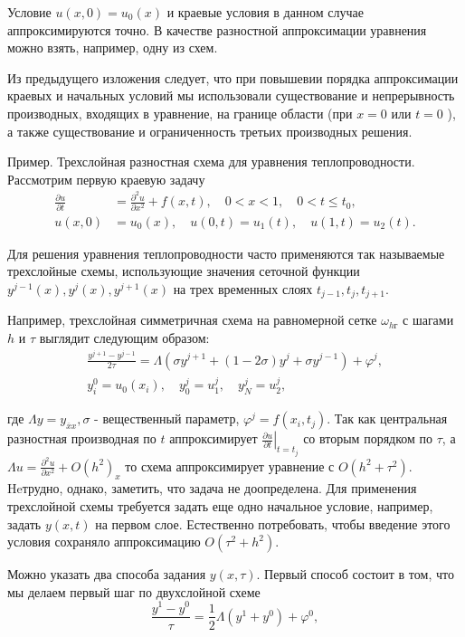 Условие $u(x, 0)=u_0(x)$ и краевые условия в данном случае аппроксимируются точно. В качестве разностной аппроксимации уравнения можно взять, например, одну из схем.

Из предыдущего изложения следует, что при повышевии порядка аппроксимации краевых и начальных условий мы использовали существование и непрерывность производных, входящих в уравнение, на границе области (при $x=0$ или $t=0$ ), а также существование и ограниченность третьих производных решения.

Пример. Трехслойная разностная схема для уравнения теплопроводности. Рассмотрим первую краевую задачу
$$
\begin{aligned}
	\frac{\partial u}{\partial t} & =\frac{\partial^2 u}{\partial x^2}+f(x, t), \quad 0<x<1, \quad 0<t \leqslant t_0, \\
	u(x, 0) & =u_0(x), \quad u(0, t)=u_1(t), \quad u(1, t)=u_2(t) .
\end{aligned}
$$

Для решения уравнения теплопроводности часто применяются так называемые трехслойные схемы, использующие значения сеточной функции $y^{j-1}(x), y^j(x), y^{j+1}(x)$ на трех временных слоях $t_{j-1}, t_j, t_{j+1}$.

Например, трехслойная симметричная схема на равномерной сетке $\omega_{h г}$ с шагами $h$ и $\tau$ выглядит следующим образом:
$$
\begin{gathered}
	\frac{y^{j+1}-y^{j-1}}{2 \tau}=\Lambda\left(\sigma y^{j+1}+(1-2 \sigma) y^j+\sigma y^{j-1}\right)+\varphi^j, \\
	y_i^0=u_0\left(x_i\right), \quad y_0^j=u_1^j, \quad y_N^j=u_2^j,
\end{gathered}
$$

где $\Lambda y=y_{\overline{x} x}, \sigma$ - вещественный параметр, $\varphi^j=f\left(x_i, t_j\right)$.
Так как центральная разностная производная по $t$ аппроксимирует $\left.\frac{\partial u}{\partial t}\right|_{t=t_j}$ со вторым порядком по $\tau$, а $\Lambda u=\frac{\partial^2 u}{\partial x^2}+O\left(h^2\right)_x$ то схема аппроксимирует уравнение с $O\left(h^2+\tau^2\right)$. Heтрудно, однако, заметить, что задача не доопределена. Для применения трехслойной схемы требуется задать еще одно начальное условие, например, задать $y(x, t)$ на первом слое. Естественно потребовать, чтобы введение этого условия сохраняло аппроксимацию $O\left(\tau^2+h^2\right)$.

Можно указать два способа задания $y(x, \tau)$. Первый способ состоит в том, что мы делаем первый шаг по двухслойной схеме
$$
\frac{y^1-y^0}{\tau}=\frac{1}{2} \Lambda\left(y^1+y^0\right)+\varphi^0,
$$

